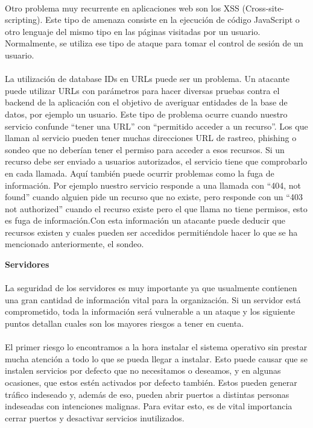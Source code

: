 \paragraph{}
Otro problema muy recurrente en aplicaciones web son los XSS
(Cross-site-scripting). Este tipo de amenaza consiste en la ejecución
de código JavaScript o otro lenguaje del mismo tipo en las páginas
visitadas por un usuario. Normalmente, se utiliza ese tipo de ataque
para tomar el control de sesión de un usuario.
\paragraph{}
La utilización de database IDs en URLs puede ser un problema. Un
atacante puede utilizar URLs con parámetros para hacer diversas
pruebas contra el backend de la aplicación con el objetivo de
averiguar entidades de la base de datos, por ejemplo un usuario. Este
tipo de problema ocurre cuando nuestro servicio confunde “tener una
URL” con “permitido acceder a un recurso”. Los que llaman al servicio
pueden tener muchas direcciones URL de rastreo, phishing o sondeo que
no deberían tener el permiso para acceder a esos recursos. Si un
recurso debe ser enviado a usuarios autorizados, el servicio tiene que
comprobarlo en cada llamada. Aquí también puede ocurrir problemas como
la fuga de información. Por ejemplo nuestro servicio responde a una
llamada con “404, not found” cuando alguien pide un recurso que no
existe, pero responde con un “403 not authorized” cuando el recurso
existe pero el que llama no tiene permisos, esto es fuga de
información.Con esta información un atacante puede deducir que
recursos existen y cuales pueden ser accedidos permitiéndole hacer lo
que se ha mencionado anteriormente, el sondeo.

\textbf{Servidores}
\paragraph{}
La seguridad de los servidores es muy importante ya que usualmente
contienen una gran cantidad de información vital para la
organización. Si un servidor está comprometido, toda la información
será vulnerable a un ataque y los siguiente puntos detallan cuales son
los mayores riesgos a tener en cuenta.
\paragraph{}
El primer riesgo lo encontramos a la hora instalar el sistema
operativo sin prestar mucha atención a todo lo que se pueda llegar a
instalar. Esto puede causar que se instalen servicios por defecto que
no necesitamos o deseamos, y en algunas ocasiones, que estos estén
activados por defecto también. Estos pueden generar tráfico indeseado
y, además de eso, pueden abrir puertos a distintas personas indeseadas
con intenciones malignas. Para evitar esto, es de vital importancia
cerrar puertos y desactivar servicios inutilizados.
